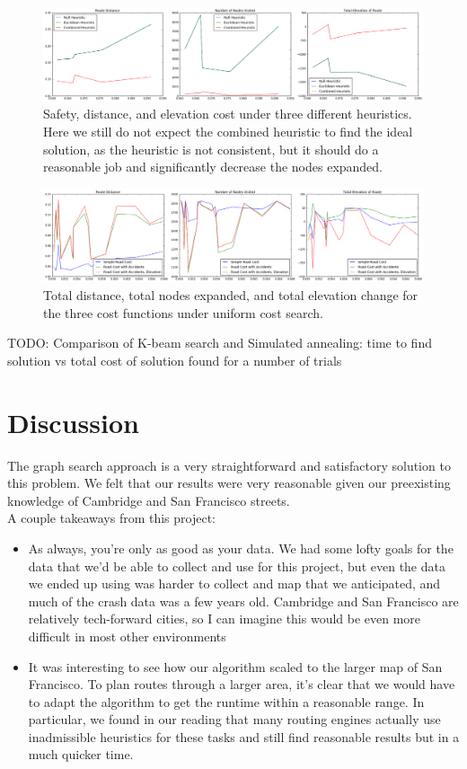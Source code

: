 \documentclass[11pt]{article}
\begin{document}
\begin{figure}[H]
\caption{Safety, distance, and elevation cost under three different heuristics. Here we still do not expect the combined heuristic to find the ideal solution, as the heuristic is not consistent, but it should do a reasonable job and significantly decrease the nodes expanded.}
\includegraphics[width=1\textwidth]{../images/cost_3.png}
\end{figure}

\begin{figure}[H]
\caption{Total distance, total nodes expanded, and total elevation change for the three cost functions under uniform cost search.}
\includegraphics[width=1\textwidth]{../images/total_costs.png}
\end{figure}

TODO: Comparison of K-beam search and Simulated annealing: time to find solution vs total cost of solution found for a number of trials

\section{Discussion}

The graph search approach is a very straightforward and satisfactory solution to this problem. We felt that our results were very reasonable given our preexisting knowledge of Cambridge and San Francisco streets. \\
A couple takeaways from this project:
\begin{itemize}
\item As always, you're only as good as your data. We had some lofty goals for the data that we'd be able to collect and use for this project, but even the data we ended up using was harder to collect and map that we anticipated, and much of the crash data was a few years old. Cambridge and San Francisco are relatively tech-forward cities, so I can imagine this would be even more difficult in most other environments
\item It was interesting to see how our algorithm scaled to the larger map of San Francisco. To plan routes through a larger area, it's clear that we would have to adapt the algorithm to get the runtime within a reasonable range. In particular, we found in our reading that many routing engines actually use inadmissible heuristics for these tasks and still find reasonable results but in a much quicker time.
\end{itemize}
\end{document}
